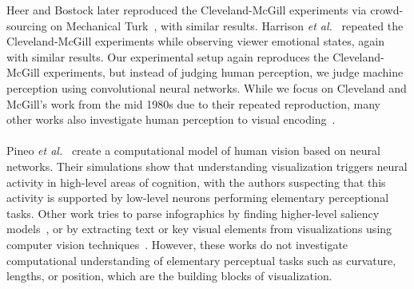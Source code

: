 Heer and Bostock later reproduced the Cleveland-McGill experiments via crowd-sourcing on Mechanical Turk~\cite{HeerBostock2010}, with similar results. Harrison \textit{et al.}~\cite{harrison2013influencing} repeated the Cleveland-McGill experiments while observing viewer emotional states, again with similar results. Our experimental setup again reproduces the Cleveland-McGill experiments, but instead of judging human perception, we judge machine perception using convolutional neural networks. While we focus on Cleveland and McGill's work from the mid 1980s due to their repeated reproduction, many other works also investigate human perception to visual encoding~\cite{mackinlay1988applying,bertin1967semiologie,treisman1988feature,carpendale2003considering,wilkinson2006grammar,widgor_perception2007,munzner2015visualization}.
%
%
\\~\\
 Pineo \textit{et al.}~\cite{Pineo2012_computational_perception} create a computational model of human vision based on neural networks. Their simulations show that understanding visualization triggers neural activity in high-level areas of cognition, with the authors suspecting that this activity is supported by low-level neurons performing elementary perceptional tasks. Other work tries to parse infographics by finding higher-level saliency models~\cite{bylinskii2016should}, or by extracting text or key visual elements from visualizations using computer vision techniques~\cite{diagram_understanding,kembhavi2016diagram,zoya_text_visual_tags,maneesh_deconstructing_d3}. However, these works do not investigate computational understanding of elementary perceptual tasks such as curvature, lengths, or position, which are the building blocks of visualization.
